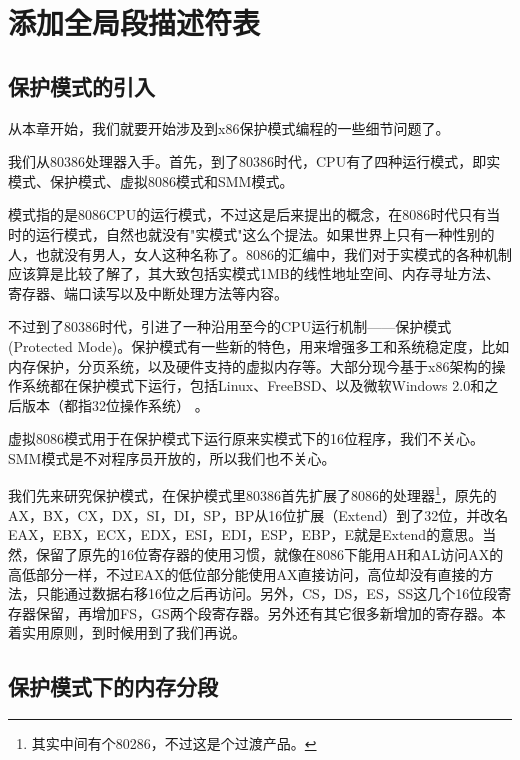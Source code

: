 
\section {添加全局段描述符表}

\subsection{保护模式的引入}

\par 从本章开始，我们就要开始涉及到x86保护模式编程的一些细节问题了。

\par 我们从80386处理器入手。首先，到了80386时代，CPU有了四种运行模式，即实模式、保护模式、虚拟8086模式和SMM模式。

\par 模式指的是8086CPU的运行模式，不过这是后来提出的概念，在8086时代只有当时的运行模式，自然也就没有"实模式"这么个提法。如果世界上只有一种性别的人，也就没有男人，女人这种名称了。8086的汇编中，我们对于实模式的各种机制应该算是比较了解了，其大致包括实模式1MB的线性地址空间、内存寻址方法、寄存器、端口读写以及中断处理方法等内容。

\par 不过到了80386时代，引进了一种沿用至今的CPU运行机制——保护模式(Protected Mode)。保护模式有一些新的特色，用来增强多工和系统稳定度，比如内存保护，分页系统，以及硬件支持的虚拟内存等。大部分现今基于x86架构的操作系统都在保护模式下运行，包括Linux、FreeBSD、以及微软Windows 2.0和之后版本（都指32位操作系统） 。

\par 虚拟8086模式用于在保护模式下运行原来实模式下的16位程序，我们不关心。SMM模式是不对程序员开放的，所以我们也不关心。

\par 我们先来研究保护模式，在保护模式里80386首先扩展了8086的处理器\footnote{其实中间有个80286，不过这是个过渡产品。}，原先的AX，BX，CX，DX，SI，DI，SP，BP从16位扩展（Extend）到了32位，并改名EAX，EBX，ECX，EDX，ESI，EDI，ESP，EBP，E就是Extend的意思。当然，保留了原先的16位寄存器的使用习惯，就像在8086下能用AH和AL访问AX的高低部分一样，不过EAX的低位部分能使用AX直接访问，高位却没有直接的方法，只能通过数据右移16位之后再访问。另外，CS，DS，ES，SS这几个16位段寄存器保留，再增加FS，GS两个段寄存器。另外还有其它很多新增加的寄存器。本着实用原则，到时候用到了我们再说。

\subsection{保护模式下的内存分段}

